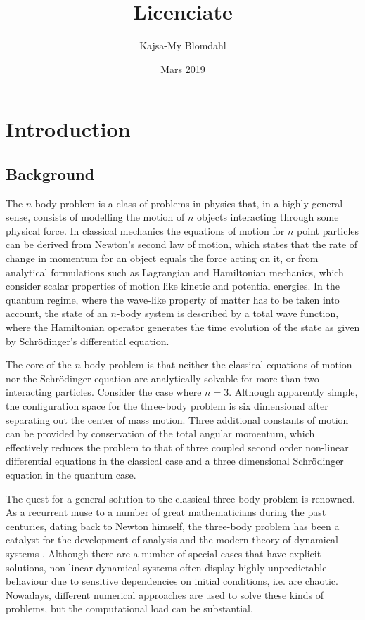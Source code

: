 \documentclass{article}
\title{Licenciate}
\author{Kajsa-My Blomdahl}
\date{Mars 2019}
\numberwithin{equation}{section}
\numberwithin{figure}{section}
\begin{document}
\maketitle

\tableofcontents

\section{Introduction}
\subsection{Background}
The $n$-body problem is a class of problems in physics that, in a highly general sense, consists of modelling the motion of $n$ objects interacting through some physical force. In classical mechanics the equations of motion for $n$ point particles can be derived from Newton's second law of motion, which states that the rate of change in momentum for an object equals the force acting on it, or from analytical formulations such as Lagrangian and Hamiltonian mechanics, which consider scalar properties of motion like kinetic and potential energies. In the quantum regime, where the wave-like property of matter has to be taken into account, the state of an $n$-body system is described by a total wave function, where the Hamiltonian operator generates the time evolution of the state as given by Schr{\"o}dinger's differential equation.

The core of the $n$-body problem is that neither the classical equations of motion nor the Schr{\"o}dinger equation are analytically solvable for more than two interacting particles. Consider the case where $n=3$. Although apparently simple, the configuration space for the three-body problem is six dimensional after separating out the center of mass motion. Three additional constants of motion can be provided by conservation of the total angular momentum, which effectively reduces the problem to that of three coupled second order non-linear differential equations in the classical case and a three dimensional Schr{\"o}dinger equation in the quantum case. 

The quest for a general solution to the classical three-body problem is renowned. As a recurrent muse to a number of great mathematicians during the past centuries, dating back to Newton himself, the three-body problem has been a catalyst for the development of analysis and the modern theory of dynamical systems \cite{Chenciner2015}. Although there are a number of special cases that have explicit solutions, non-linear dynamical systems often display highly unpredictable behaviour due to sensitive dependencies on initial conditions, i.e. are chaotic. Nowadays, different numerical approaches are used to solve these kinds of problems, but the computational load can be substantial. 
\end{document}
